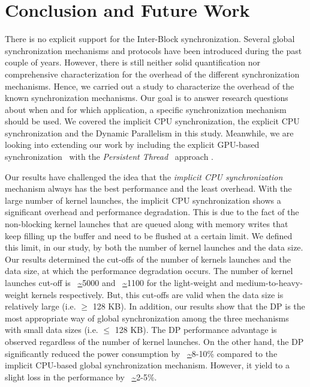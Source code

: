 \documentclass[conference]{IEEEtran}
\begin{document}
\section{Conclusion and Future Work}
\label{sec:conclusion}
There is no explicit support for the Inter-Block synchronization. Several global synchronization mechanisms and protocols have been introduced during the past couple of years. However, there is still neither solid quantification nor comprehensive characterization for the overhead of the different synchronization mechanisms. Hence, we carried out a study to characterize the overhead of the known synchronization mechanisms. Our goal is to answer research questions about when and for which application, a specific synchronization mechanism should be used. We covered the implicit CPU synchronization, the explicit CPU synchronization and the Dynamic Parallelism in this study. Meanwhile, we are looking into extending our work by including the explicit GPU-based synchronization~\cite{proc9} with the \emph{Persistent Thread}~\cite{proc13} approach . 

Our results have challenged the idea that the \emph{implicit CPU synchronization} mechanism always has the best performance and the least overhead. With the large number of kernel launches, the implicit CPU synchronization shows a significant overhead and performance degradation. This is due to the fact of the non-blocking kernel launches that are queued along with memory writes that keep filling up the buffer and need to be flushed at a certain limit. We defined this limit, in our study, by both the number of kernel launches and the data size. Our results determined the cut-offs of the number of kernels launches and the data size, at which the performance degradation occurs. The number of kernel launches cut-off is ~\url{~}5000 and ~\url{~}1100 for the light-weight and medium-to-heavy-weight kernels respectively. But, this cut-offs are valid when the data size is relatively large (i.e. $\geq$ 128 KB). In addition, our results show that the DP is the most appropriate way of global synchronization among the three mechanisms with small data sizes (i.e. $\leq$ 128 KB). The DP performance advantage is observed regardless of the number of kernel launches. On the other hand, the DP significantly reduced the power consumption by ~\url{~}8-10\% compared to the implicit CPU-based global synchronization mechanism. However, it yield to a slight loss in the performance by ~\url{~}2-5\%. 
\end{document}
